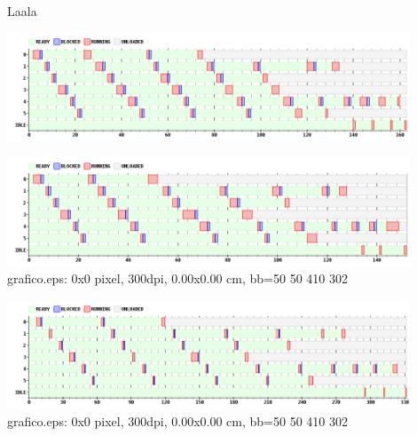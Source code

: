 Laala
\begin {center}
\includegraphics[width=12cm]{../simusched/outputs/ej7/rr-ej7-2-3.png}
\end {center}

\begin {center}
\includegraphics[width=12cm]{../simusched/outputs/ej7/rr-ej7-2-5.png}
grafico.eps: 0x0 pixel, 300dpi, 0.00x0.00 cm, bb=50 50 410 302
\end {center}

\begin {center}
\includegraphics[width=12cm]{../simusched/outputs/ej7/rr-ej7-7-15.png}
grafico.eps: 0x0 pixel, 300dpi, 0.00x0.00 cm, bb=50 50 410 302
\end {center}
